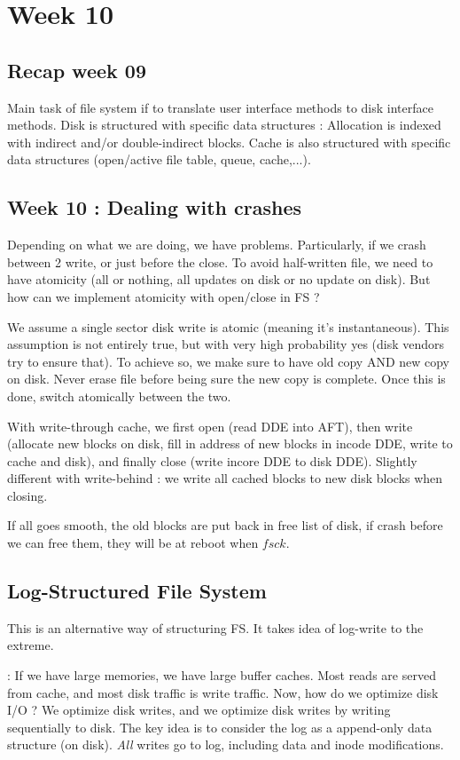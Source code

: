 \documentclass[12pt,a4paper]{article}
\begin{document}
\section{Week 10}
\subsection{Recap week 09}
Main task of file system if to translate user interface methods to disk interface methods. Disk is structured with specific data structures : Allocation is indexed with indirect and/or double-indirect blocks. Cache is also structured with specific data structures (open/active file table, queue, cache,...). 

\subsection{Week 10 : Dealing with crashes}
Depending on what we are doing, we have problems. Particularly, if we crash between 2 write, or just before the close. To avoid half-written file, we need to have atomicity (all or nothing, all updates on disk or no update on disk). But how can we implement atomicity with open/close in FS ?

We assume a single sector disk write is atomic (meaning it's instantaneous). This assumption is not entirely true, but with very high probability yes (disk vendors try to ensure that). To achieve so, we make sure to have old copy AND new copy on disk. Never erase file before being sure the new copy is complete. Once this is done, switch atomically between the two. 

With write-through cache, we first open (read DDE into AFT), then write (allocate new blocks on disk, fill in address of new blocks in incode DDE, write to cache and disk), and finally close (write incore DDE to disk DDE). Slightly different with write-behind : we write all cached blocks to new disk blocks when closing.

If all goes smooth, the old blocks are put back in free list of disk, if crash before we can free them, they will be at reboot when $fsck$.

\subsection{Log-Structured File System}
This is an alternative way of structuring FS. It takes idea of log-write to the extreme. 

 : If we have large memories, we have large buffer caches. Most reads are served from cache, and most disk traffic is write traffic. Now, how do we optimize disk I/O ? We optimize disk writes, and we optimize disk writes by writing sequentially to disk. The key idea is to consider the log as a append-only data structure (on disk). \textit{All} writes go to log, including data and inode modifications. 
\end{document}
